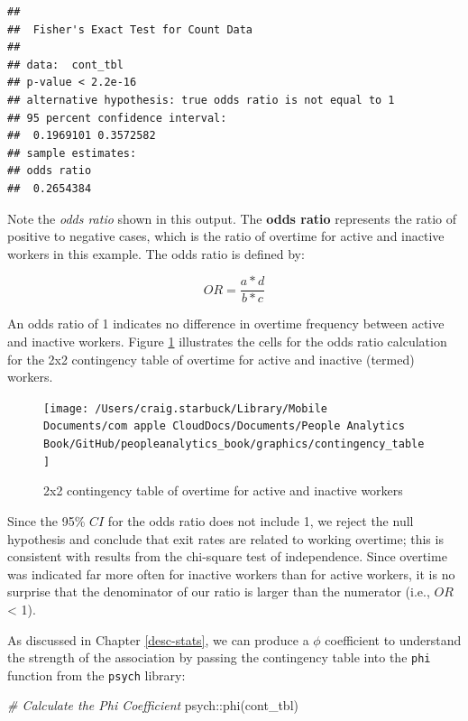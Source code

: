 \documentclass[
]{book}
\newenvironment{Shaded}{\begin{snugshade}}{\end{snugshade}}
\newcommand{\CommentTok}[1]{\textcolor[rgb]{0.56,0.35,0.01}{\textit{#1}}}
\newcommand{\FunctionTok}[1]{\textcolor[rgb]{0.00,0.00,0.00}{#1}}
\newcommand{\NormalTok}[1]{#1}
\newcommand{\SpecialCharTok}[1]{\textcolor[rgb]{0.00,0.00,0.00}{#1}}
\begin{document}
\begin{verbatim}
## 
##  Fisher's Exact Test for Count Data
## 
## data:  cont_tbl
## p-value < 2.2e-16
## alternative hypothesis: true odds ratio is not equal to 1
## 95 percent confidence interval:
##  0.1969101 0.3572582
## sample estimates:
## odds ratio 
##  0.2654384
\end{verbatim}

Note the \emph{odds ratio} shown in this output. The \textbf{odds ratio} represents the ratio of positive to negative cases, which is the ratio of overtime for active and inactive workers in this example. The odds ratio is defined by:

\[OR = \frac{a*d}{b*c}\]

An odds ratio of 1 indicates no difference in overtime frequency between active and inactive workers. Figure \ref{fig:contingency-tbl} illustrates the cells for the odds ratio calculation for the 2x2 contingency table of overtime for active and inactive (termed) workers.

\begin{figure}

{\centering \texttt{[image: /Users/craig.starbuck/Library/Mobile Documents/com~apple~CloudDocs/Documents/People Analytics Book/GitHub/peopleanalytics\_book/graphics/contingency\_table]} 

}

\caption{2x2 contingency table of overtime for active and inactive workers}\label{fig:contingency-tbl}
\end{figure}

Since the 95\% \(CI\) for the odds ratio does not include 1, we reject the null hypothesis and conclude that exit rates are related to working overtime; this is consistent with results from the chi-square test of independence. Since overtime was indicated far more often for inactive workers than for active workers, it is no surprise that the denominator of our ratio is larger than the numerator (i.e., \(OR\) \textless{} 1).

As discussed in Chapter \ref{desc-stats}, we can produce a \(\phi\) coefficient to understand the strength of the association by passing the contingency table into the \texttt{phi} function from the \texttt{psych} library:

\begin{Shaded}
\begin{Highlighting}[]
\CommentTok{\# Calculate the Phi Coefficient}
\NormalTok{psych}\SpecialCharTok{::}\FunctionTok{phi}\NormalTok{(cont\_tbl)}
\end{Highlighting}
\end{Shaded}
\end{document}
